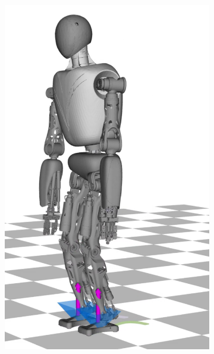 \begin{figure}
\begin{subfigure}{.16\textwidth}
	\includegraphics[width=.95\linewidth]{fig/walkDynamic/snaps/7}
	\caption{}
\end{subfigure}%
\begin{subfigure}{.16\textwidth}

\end{subfigure}
\end{figure}
